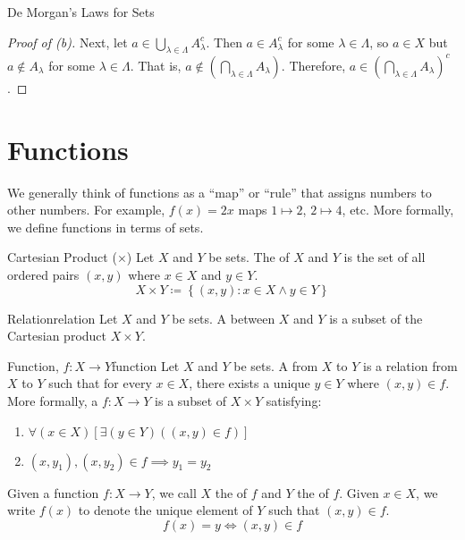 \begin{thmbox}{De Morgan's Laws for Sets}{}
\begin{proof}[Proof of (b)]
        Next, let $a \in \bigcup_{\lambda \in \Lambda} A_\lambda^c$. Then $a \in A_\lambda^c$ for some $\lambda \in \Lambda$, so $a \in X$ but $a \notin A_\lambda$ for some $\lambda \in \Lambda$. That is, $a \notin \left( \bigcap_{\lambda \in \Lambda} A_\lambda \right)$. Therefore, $a \in  \left( \bigcap_{\lambda \in \Lambda} A_\lambda \right)^c$.
    \end{proof}
\end{thmbox}

\section{Functions}
We generally think of functions as a ``map'' or ``rule'' that assigns numbers to other numbers. For example, $f(x) = 2x$ maps $1 \mapsto 2$, $2 \mapsto 4$, etc. More formally, we define functions in terms of sets. 


\begin{dfnbox}{Cartesian Product ($\times$)}{}
    Let $X$ and $Y$ be sets. The  of $X$ and $Y$ is the set of all ordered pairs $(x,y)$ where $x \in X$ and $y \in Y$.
    \tcblower
    \[ X \times Y \coloneq \left\{ (x,y) : x \in X \land y \in Y \right\} \]
\end{dfnbox}

\begin{dfnbox}{Relation}{relation}
    Let $X$ and $Y$ be sets. A  between $X$ and $Y$ is a subset of the Cartesian product $X \times Y$.
\end{dfnbox}

\begin{dfnbox}{Function, $f : X \to Y$}{function}
    Let $X$ and $Y$ be sets. A  from $X$ to $Y$ is a relation from $X$ to $Y$ such that for every $x \in X$, there exists a unique $y \in Y$ where $(x,y) \in f$.
    \tcblower
    More formally, a  $f : X \to Y$ is a subset of $X \times Y$ satisfying:
    \begin{enumerate}[noitemsep]
        \item $\forall (x \in X) \left[ \exists (y \in Y)((x,y) \in f) \right]$
        \item $(x,y_1),(x,y_2) \in f \implies y_1 = y_2$
    \end{enumerate}
\end{dfnbox}

Given a function $f : X \to Y$, we call $X$ the  of $f$ and $Y$ the  of $f$. Given $x \in X$, we write $f(x)$ to denote the unique element of $Y$ such that $(x,y) \in f$.
\[ f(x) = y \iff (x,y) \in f \]

